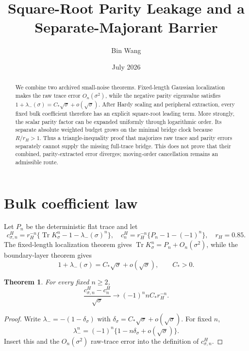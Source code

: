 \documentclass[11pt]{article}
\title{Square-Root Parity Leakage and a Separate-Majorant Barrier}
\author{Bin Wang}\date{July 2026}
\newtheorem{theorem}{Theorem}[section]
\theoremstyle{remark}\newtheorem{remark}[theorem]{Remark}
\begin{document}
\maketitle
\begin{abstract}
We combine two archived small-noise theorems.  Fixed-length Gaussian
localization makes the raw trace error $O_n(\sigma^2)$, while the negative
parity eigenvalue satisfies
$1+\lambda_-(\sigma)=C_*\sqrt\sigma+o(\sqrt\sigma)$.  After Hardy scaling
and peripheral extraction, every fixed bulk coefficient therefore has an
explicit square-root leading term.  More strongly, the scalar parity factor
can be expanded uniformly through logarithmic order.  Its separate absolute
weighted budget grows on the minimal bridge clock because $R/r_H>1$.  Thus a
triangle-inequality proof that majorizes raw trace and parity errors
separately cannot supply the missing full-trace bridge.  This does not prove
that their combined, parity-extracted error diverges; moving-order
cancellation remains an admissible route.
\end{abstract}

\section{Bulk coefficient law}
Let $P_n$ be the deterministic flat trace and let
\[
 c^H_{\sigma,n}=r_H^{-n}
 \{\operatorname{Tr}K_\sigma^n-1-\lambda_-(\sigma)^n\},
\quad
 c^H_n=r_H^{-n}\{P_n-1-(-1)^n\},
\quad r_H=0.85.
\]
The fixed-length localization theorem gives
$\operatorname{Tr}K_\sigma^n=P_n+O_n(\sigma^2)$, while the boundary-layer
theorem gives
\[
 1+\lambda_-(\sigma)=C_*\sqrt\sigma+o(\sqrt\sigma),
\qquad C_*>0.
\]

\begin{theorem}\label{thm:leakage}
For every fixed $n\ge2$,
\[
 \frac{c^H_{\sigma,n}-c^H_n}{\sqrt\sigma}
 \longrightarrow (-1)^n nC_*r_H^{-n}.
\]
\end{theorem}
\begin{proof}
Write $\lambda_-=-(1-\delta_\sigma)$ with
$\delta_\sigma=C_*\sqrt\sigma+o(\sqrt\sigma)$.  For fixed $n$,
\[
 \lambda_-^n=(-1)^n\{1-n\delta_\sigma+o(\sqrt\sigma)\}.
\]
Insert this and the $O_n(\sigma^2)$ raw-trace error into the definition of
$c^H_{\sigma,n}$.
\end{proof}
\end{document}
